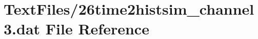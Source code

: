 \hypertarget{26time2histsim__channel3_8dat}{}\section{Text\+Files/26time2histsim\+\_\+channel3.dat File Reference}
\label{26time2histsim__channel3_8dat}
